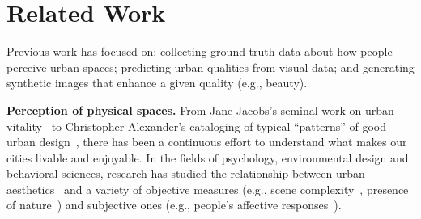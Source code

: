 \section{Related Work}
\label{sec:related}
Previous work has focused on: collecting ground truth data about how people perceive urban spaces; predicting urban qualities from visual data; and generating synthetic images that enhance a given quality (e.g., beauty). 

\vspace{4pt}\noindent
\textbf{Perception of physical spaces.} From Jane Jacobs's seminal work on urban vitality~\cite{jacobs1961death} to Christopher Alexander's cataloging of typical ``patterns'' of good urban design~\cite{alexander1977pattern}, there has been a continuous effort to understand what makes our cities livable and enjoyable.  In the fields of psychology, environmental design and behavioral sciences, research has studied the relationship between urban aesthetics~\cite{real2000classification} and a variety of objective measures  (e.g.,  scene complexity~\cite{kaplan1972rated}, presence of nature~\cite{kaplan1989experience}) and subjective ones (e.g., people's affective responses~\cite{ulrich1983aesthetic}).  



